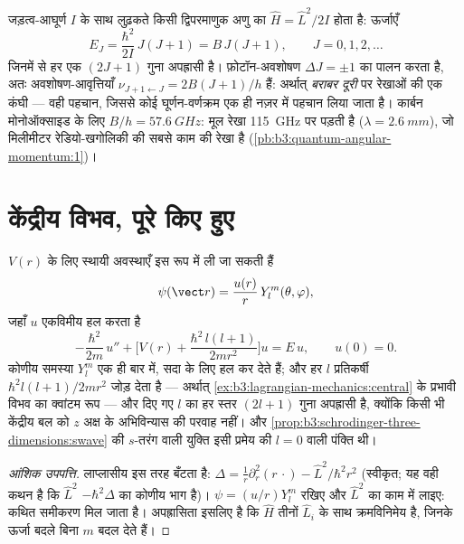 \begin{example}[दृढ़ घूर्णक और उसकी सीढ़ी]\label{ex:b3:quantum-angular-momentum:rotor}
जड़त्व-आघूर्ण $I$ के साथ लुढ़कते किसी द्विपरमाणुक अणु का $\hat H
= \hat L^2/2I$ होता है: ऊर्जाएँ
\[
E_J = \frac{\hbar^2}{2I}\,J(J+1) = B\,J(J+1) ,
\qquad J = 0, 1, 2, \dots
\]
जिनमें से हर एक $(2J+1)$ गुना अपह्रासी है। फ़ोटॉन-अवशोषण $\Delta J =
\pm1$ का पालन करता है, अतः अवशोषण-आवृत्तियाँ $\nu_{J+1\leftarrow J} =
2B(J+1)/h$ हैं: अर्थात् \emph{बराबर दूरी} पर रेखाओं की एक कंघी --- वही
पहचान, जिससे कोई घूर्णन-वर्णक्रम एक ही नज़र में पहचान लिया जाता है। कार्बन
मोनोऑक्साइड के लिए $B/h = \qty{57.6}{GHz}$: मूल रेखा
\qty{115}{GHz} पर पड़ती है ($\lambda = \qty{2.6}{mm}$), जो मिलीमीटर
रेडियो-खगोलिकी की सबसे काम की रेखा है
(\cref{pb:b3:quantum-angular-momentum:1})।
\end{example}

\section{केंद्रीय विभव, पूरे किए हुए}

\begin{theorem}[किसी भी केंद्रीय विभव में पृथक्करण]\label{thm:b3:quantum-angular-momentum:radial}
$V(r)$ के लिए स्थायी अवस्थाएँ इस रूप में ली जा सकती हैं
\[
\psi(\vect r) = \frac{u(r)}{r}\,Y_l^m(\theta, \varphi) ,
\]
जहाँ $u$ एकविमीय  हल करता है
\[
-\frac{\hbar^2}{2m}\,u'' + \Big[V(r) +
\frac{\hbar^2\,l(l+1)}{2mr^2}\Big]u = E\,u , \qquad u(0) = 0 .
\]
कोणीय समस्या $Y_l^m$ एक ही बार में, सदा के लिए हल कर देते हैं; और हर
$l$ प्रतिकर्षी \emph{}
$\hbar^2l(l+1)/2mr^2$ जोड़ देता है --- अर्थात्
\cref{ex:b3:lagrangian-mechanics:central} के प्रभावी विभव का क्वांटम
रूप --- और दिए गए $l$ का हर स्तर $(2l+1)$ गुना अपह्रासी है, क्योंकि
किसी भी केंद्रीय बल को $z$ अक्ष के अभिविन्यास की परवाह नहीं। और
\cref{prop:b3:schrodinger-three-dimensions:swave} की $s$-तरंग वाली
युक्ति इसी प्रमेय की $l = 0$ वाली पंक्ति थी।
\end{theorem}

\begin{proof}[आंशिक उपपत्ति]
लाप्लासीय इस तरह बँटता है: $\Delta = \tfrac1r\partial_r^2(r\,\cdot) -
\hat L^2/\hbar^2r^2$ (स्वीकृत; यह वही कथन है कि $\hat L^2$
$-\hbar^2\Delta$ का कोणीय भाग है)। $\psi = (u/r)Y_l^m$ रखिए
और $\hat L^2$ का  काम में लाइए: कथित समीकरण मिल जाता है।
अपह्रासिता इसलिए है कि $\hat H$ तीनों $\hat
L_i$ के साथ क्रमविनिमेय है, जिनके  ऊर्जा बदले बिना $m$ बदल देते हैं।
\end{proof}

